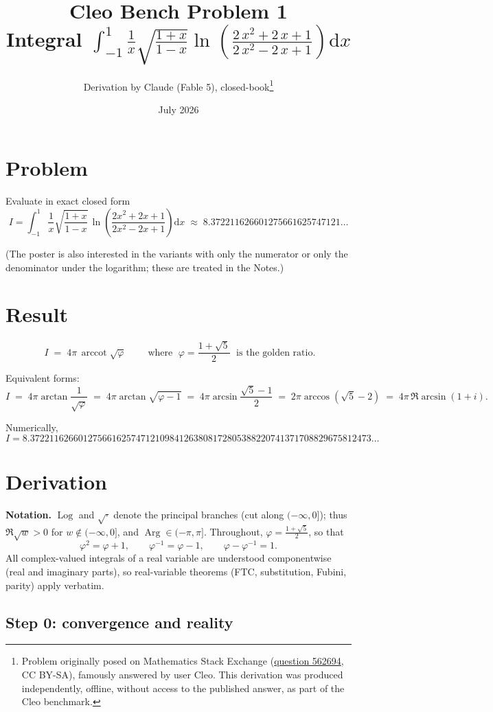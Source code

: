 \documentclass[11pt]{article}
\title{Cleo Bench Problem 1\\[1ex]\large Integral $\int_{-1}^1\frac1x\sqrt{\frac{1+x}{1-x}}\ln\left(\frac{2\,x^2+2\,x+1}{2\,x^2-2\,x+1}\right) \mathrm dx$}
\author{Derivation by Claude (Fable 5), closed-book\thanks{Problem originally
posed on Mathematics Stack Exchange
(\href{https://math.stackexchange.com/q/562694}{question 562694}, CC BY-SA),
famously answered by user Cleo. This derivation was produced independently,
offline, without access to the published answer, as part of the Cleo benchmark.}}
\date{July 2026}
\theoremstyle{remark}
\begin{document}
\maketitle

\section*{Problem}

Evaluate in exact closed form
$$I=\int_{-1}^1\frac1x\sqrt{\frac{1+x}{1-x}}\,\ln\!\left(\frac{2x^2+2x+1}{2x^2-2x+1}\right)\mathrm{d}x
\;\approx\; 8.372211626601275661625747121\ldots$$

(The poster is also interested in the variants with only the numerator or only the denominator under the logarithm; these are treated in the Notes.)

\section*{Result}

$$\boxed{\;I \;=\; 4\pi\,\operatorname{arccot}\sqrt{\varphi}\;}\qquad\text{where }\;\varphi=\frac{1+\sqrt5}{2}\;\text{ is the golden ratio.}$$

Equivalent forms:
$$I \;=\; 4\pi\arctan\frac{1}{\sqrt\varphi}\;=\;4\pi\arctan\sqrt{\varphi-1}\;=\;4\pi\arcsin\frac{\sqrt5-1}{2}\;=\;2\pi\arccos\left(\sqrt5-2\right)\;=\;4\pi\,\Re\arcsin(1+i).$$

Numerically,
$$I=8.37221162660127566162574712109841263808172805388220741371708829675812473\ldots$$

\section*{Derivation}

\textbf{Notation.} $\operatorname{Log}$ and $\sqrt{\cdot}$ denote the principal branches (cut along $(-\infty,0]$); thus $\Re\sqrt w>0$ for $w\notin(-\infty,0]$, and $\operatorname{Arg}\in(-\pi,\pi]$. Throughout, $\varphi=\frac{1+\sqrt5}2$, so that
$$\varphi^2=\varphi+1,\qquad \varphi^{-1}=\varphi-1,\qquad \varphi-\varphi^{-1}=1 .$$
All complex-valued integrals of a real variable are understood componentwise (real and imaginary parts), so real-variable theorems (FTC, substitution, Fubini, parity) apply verbatim.

\subsection*{Step 0: convergence and reality}
\end{document}
